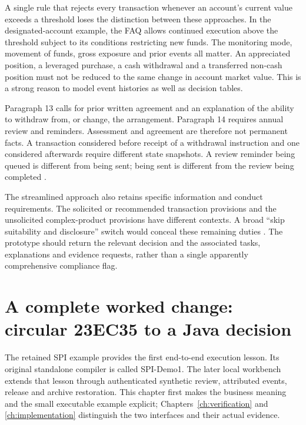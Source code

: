 A single rule that rejects every transaction whenever an account's current value
exceeds a threshold loses the distinction between these approaches. In the
designated-account example, the FAQ allows continued execution above the
threshold subject to its conditions restricting new funds. The monitoring mode,
movement of funds, gross exposure and prior events all matter. An appreciated
position, a leveraged purchase, a cash withdrawal and a transferred non-cash
position must not be reduced to the same change in account market value. This is
a strong reason to model event histories as well as decision tables.


Paragraph 13 calls for prior written agreement and an explanation of the ability
to withdraw from, or change, the arrangement. Paragraph 14 requires annual review
and reminders. Assessment and agreement are therefore not permanent facts. A
transaction considered before receipt of a withdrawal instruction and one
considered afterwards require different state snapshots. A review reminder being
queued is different from being sent; being sent is different from the review
being completed \citep[Annex 1, paras.~12--14]{sfcspiannex1}.

The streamlined approach also retains specific information and conduct
requirements. The solicited or recommended transaction provisions and the
unsolicited complex-product provisions have different contexts. A broad
``skip suitability and disclosure'' switch would conceal these remaining duties
\citep[Annex 1, paras.~9--11]{sfcspiannex1}. The prototype should return the
relevant decision and the associated tasks, explanations and evidence requests,
rather than a single apparently comprehensive compliance flag.

\section{A complete worked change: circular 23EC35 to a Java decision}

The retained SPI example provides the first end-to-end execution lesson.
Its original standalone compiler is called SPI-Demo1. The later local workbench
extends that lesson through authenticated synthetic review, attributed events,
release and archive restoration. This chapter first makes the business meaning
and the small executable example explicit; Chapters~\ref{ch:verification} and
\ref{ch:implementation} distinguish the two interfaces and their actual evidence.


